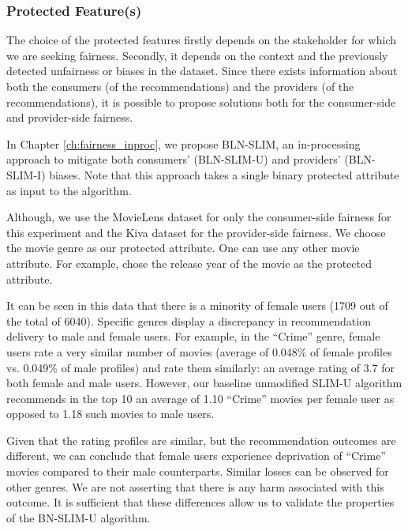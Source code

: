        \subsubsection{Protected Feature(s)}
        The choice of the protected features firstly depends on the stakeholder for which we are seeking fairness. Secondly, it depends on the context and the previously detected unfairness or biases in the dataset. Since there exists information about both the consumers (of the recommendations) and the providers (of the recommendations), it is possible to propose solutions both for the consumer-side and provider-side fairness.
        
        In Chapter \ref{ch:fairness_inproc}, we propose BLN-SLIM, an in-processing approach to mitigate both consumers' (BLN-SLIM-U) and providers' (BLN-SLIM-I) biases. Note that this approach takes a single binary protected attribute as input to the algorithm.
        
        Although, we use the MovieLens dataset for only the consumer-side fairness for this experiment and the Kiva dataset for the provider-side fairness. We choose the movie genre as our protected attribute. One can use any other movie attribute. For example, \cite{kamishima2018recommendation} chose the release year of the movie as the protected attribute.
        
        It can be seen in this data that there is a minority of female users (1709 out of the total of 6040). Specific genres display a discrepancy in recommendation delivery to male and female users. For example, in the ``Crime'' genre, female users rate a very similar number of movies (average of 0.048\% of female profiles vs. 0.049\% of male profiles) and rate them similarly: an average rating of 3.7 for both female and male users. However, our baseline unmodified SLIM-U algorithm recommends in the top 10 an average of 1.10 ``Crime'' movies per female user as opposed to 1.18 such movies to male users. 
        
        Given that the rating profiles are similar, but the recommendation outcomes are different, we can conclude that female users experience deprivation of ``Crime'' movies compared to their male counterparts. Similar losses can be observed for other genres. We are not asserting that there is any harm associated with this outcome. It is sufficient that these differences allow us to validate the properties of the BN-SLIM-U algorithm.
        
